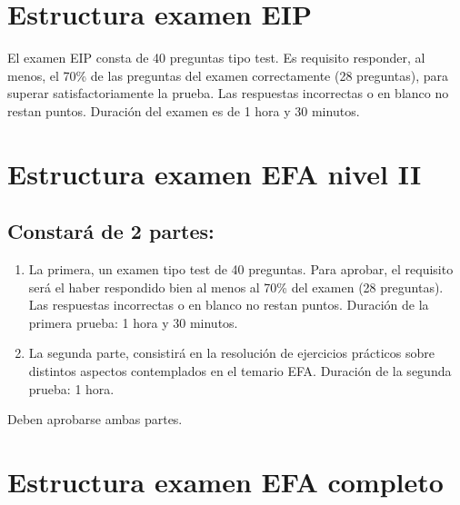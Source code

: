 \documentclass[
  letterpaper,
  DIV=11,
  numbers=noendperiod]{scrreprt}
\begin{document}
\hypertarget{estructura-examen-eip}{%
\section*{\texorpdfstring{\textbf{Estructura examen
EIP}}{Estructura examen EIP}}\label{estructura-examen-eip}}


El examen EIP consta de 40 preguntas tipo test. Es requisito responder,
al menos, el 70\% de las preguntas del examen correctamente (28
preguntas), para superar satisfactoriamente la prueba. Las respuestas
incorrectas o en blanco no restan puntos. Duración del examen es de 1
hora y 30 minutos.

\hypertarget{estructura-examen-efa-nivel-ii}{%
\section*{\texorpdfstring{\textbf{Estructura examen EFA nivel
II}}{Estructura examen EFA nivel II}}\label{estructura-examen-efa-nivel-ii}}


\hypertarget{constaruxe1-de-2-partes}{%
\subsection*{Constará de 2 partes:}\label{constaruxe1-de-2-partes}}

\begin{enumerate}
\def\labelenumi{\arabic{enumi}.}
\item
  La primera, un examen tipo test de 40 preguntas. Para aprobar, el
  requisito será el haber respondido bien al menos al 70\% del examen
  (28 preguntas). Las respuestas incorrectas o en blanco no restan
  puntos. Duración de la primera prueba: 1 hora y 30 minutos.
\item
  La segunda parte, consistirá en la resolución de ejercicios prácticos
  sobre distintos aspectos contemplados en el temario EFA. Duración de
  la segunda prueba: 1 hora.
\end{enumerate}

Deben aprobarse ambas partes.

\hypertarget{estructura-examen-efa-completo}{%
\section*{\texorpdfstring{\textbf{Estructura examen EFA
completo}}{Estructura examen EFA completo}}\label{estructura-examen-efa-completo}}
\end{document}

